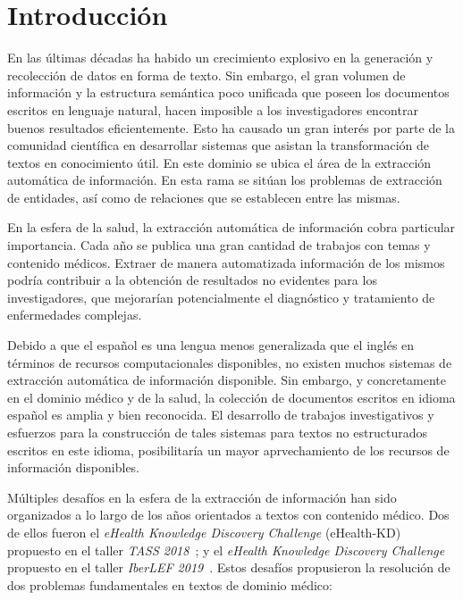 \chapter*{Introducción}\label{chapter:introduction}

En las últimas décadas ha habido un crecimiento explosivo en la generación y recolección de datos en forma de texto.
Sin embargo, el gran volumen de información y la estructura semántica poco unificada que poseen los documentos escritos en lenguaje natural, hacen imposible a los investigadores encontrar buenos resultados eficientemente.
Esto ha causado un gran interés por parte de la comunidad científica en desarrollar sistemas que asistan la transformación de textos en conocimiento útil.
En este dominio se ubica el área de la extracción automática de información.
En esta rama se sitúan los problemas de extracción de entidades, así como de relaciones que se establecen entre las mismas. 

En la esfera de la salud, la extracción automática de información cobra particular importancia.
Cada año se publica una gran cantidad de trabajos con temas y contenido médicos.
Extraer de manera automatizada información de los mismos podría contribuir a la obtención de resultados no evidentes para los investigadores, que mejorarían potencialmente el diagnóstico y tratamiento de enfermedades complejas.

Debido a que el español es una lengua menos generalizada que el inglés en términos de recursos computacionales disponibles, no existen muchos sistemas de extracción automática de información disponible.
Sin embargo, y concretamente en el dominio médico y de la salud, la colección de documentos escritos en idioma español es amplia y bien reconocida.
El desarrollo de trabajos investigativos y esfuerzos para la construcción de tales sistemas para textos no estructurados escritos en este idioma, posibilitaría un mayor aprvechamiento de los recursos de información disponibles.

Múltiples desafíos en la esfera de la extracción de información han sido organizados a lo largo de los años orientados a textos con contenido médico.
Dos de ellos fueron el \emph{eHealth Knowledge Discovery Challenge} (eHealth-KD) propuesto en el taller \emph{TASS 2018}~\cite{martinez2018overview}; y el \emph{eHealth Knowledge Discovery Challenge} propuesto en el taller \emph{IberLEF 2019}~\cite{ehealthkd19_overview}.
Estos desafíos propusieron la resolución de dos problemas fundamentales en textos de dominio médico:

